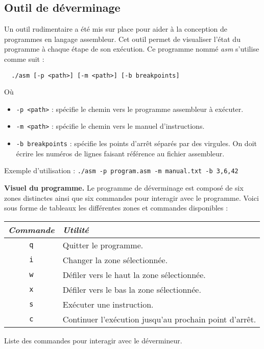 \subsection*{Outil de déverminage}
\noindent
Un outil rudimentaire a été mis sur place pour aider à la conception
de programmes en langage assembleur. Cet outil permet de visualiser
l'état du programme à chaque étape de son exécution. Ce programme 
nommé \emph{asm} s'utilise comme suit :
\begin{verbatim}
  ./asm [-p <path>] [-m <path>] [-b breakpoints]
\end{verbatim}
Où 
\begin{itemize}
  \item \texttt{-p <path>} : spécifie le chemin vers le programme 
    assembleur à exécuter.
  \item \texttt{-m <path>} : spécifie le chemin vers le manuel 
    d'instructions.
  \item \texttt{-b breakpoints} : spécifie les points d'arrêt séparés 
    par des virgules. On doit écrire les numéros de lignes faisant
    référence au fichier assembleur.
\end{itemize}
Exemple d'utilisation :
\verb|./asm -p program.asm -m manual.txt -b 3,6,42|
\medskip

\noindent
\textbf{Visuel du programme. } \quad
Le programme de déverminage est composé de six zones distinctes ainsi
que six commandes pour interagir avec le programme. Voici sous forme 
de tableaux les différentes zones et commandes disponibles :

\begin{center}
\begin{tabular}{cl}
  \toprule
  \emph{Commande} & \emph{Utilité} \\
  \midrule
  \texttt{q} & Quitter le programme. \\
  \texttt{i} & Changer la zone sélectionnée. \\
  \texttt{w} & Défiler vers le haut la zone sélectionnée. \\
  \texttt{x} & Défiler vers le bas la zone sélectionnée. \\
  \texttt{s} & Exécuter une instruction. \\
  \texttt{c} & Continuer l'exécution jusqu'au prochain point d'arrêt. \\
  \bottomrule
\end{tabular} 
\medskip

Liste des commandes pour interagir avec le dévermineur.
\end{center}
\medskip

